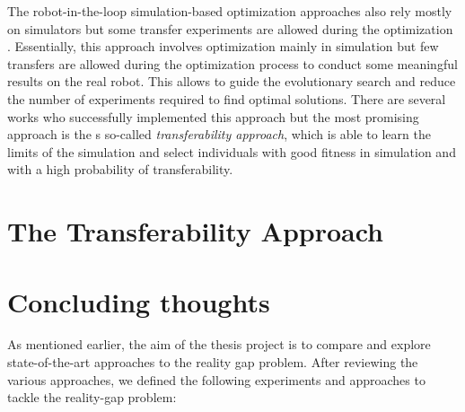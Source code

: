 The robot-in-the-loop simulation-based optimization approaches also rely mostly on simulators but some transfer experiments are allowed during the optimization \cite{inproceedings}. Essentially, this approach involves optimization mainly in simulation but few transfers are allowed during the optimization process to conduct some meaningful results on the real robot. This allows to guide the evolutionary search and reduce the number of experiments required to find optimal solutions. There are several works who successfully implemented this approach \cite{bongard2006resilient} \cite{koos2009automatic} but the most promising approach is the s so-called \emph{transferability approach}, which is able to learn the limits of the simulation and select individuals with good fitness in simulation and with a high probability of transferability.

\section{The Transferability Approach}

\section{Concluding thoughts}

As mentioned earlier, the aim of the thesis project is to compare and explore state-of-the-art approaches to the reality gap problem. After reviewing the various approaches, we defined the following experiments and approaches to tackle the reality-gap problem:

